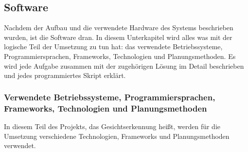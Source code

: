 \subsection{Software}
Nachdem der Aufbau und die verwendete Hardware des Systems beschrieben wurden, ist die Software dran. In diesem Unterkapitel wird alles was mit der logische Teil der Umsetzung zu tun hat: das verwendete Betriebssysteme, Programmiersprachen, Frameworks, Technologien und Planungsmethoden. Es wird jede Aufgabe zusammen mit der zugehörigen Lösung im Detail beschrieben und jedes programmiertes Skript erklärt.
\subsubsection{Verwendete Betriebssysteme, Programmiersprachen, Frameworks, Technologien und Planungsmethoden}
In diesem Teil des Projekts, das Gesichtserkennung heißt, werden für die Umsetzung verschiedene Technologien,  Frameworks und Planungsmethoden verwendet.
